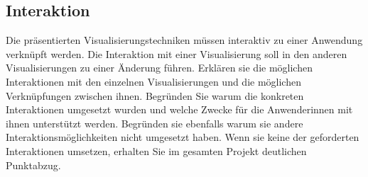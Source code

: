 \subsection{Interaktion}
Die präsentierten Visualisierungstechniken müssen interaktiv zu einer Anwendung verknüpft werden.
Die Interaktion mit einer Visualisierung soll in den anderen Visualisierungen zu einer Änderung führen. 
Erklären sie die möglichen Interaktionen mit den einzelnen Visualisierungen und die möglichen Verknüpfungen zwischen ihnen. Begründen Sie warum die konkreten Interaktionen umgesetzt wurden und welche Zwecke für die Anwenderinnen mit ihnen unterstützt werden. Begründen sie ebenfalls warum sie andere Interaktionsmöglichkeiten nicht umgesetzt haben. Wenn sie keine der geforderten Interaktionen umsetzen, erhalten Sie im gesamten Projekt deutlichen Punktabzug. 
